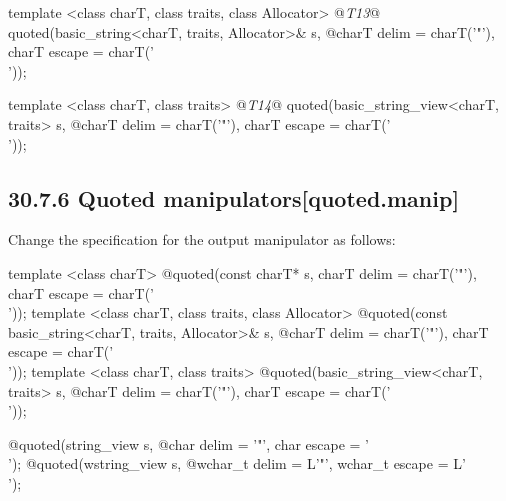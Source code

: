 \documentclass[ebook,11pt,article]{memoir}
\begin{document}
\begin{codeblock}
  template <class charT, class traits, class Allocator>
    @\textit{T13}@ quoted(basic_string<charT, traits, Allocator>& s,
    @\itcorr@           charT delim = charT('"'), charT escape = charT('\\'));

\end{codeblock}
\begin{removedblock}
\begin{codeblock}
  template <class charT, class traits>
    @\textit{T14}@ quoted(basic_string_view<charT, traits> s,
    @\itcorr@           charT delim = charT('"'), charT escape = charT('\\'));
\end{codeblock}
\end{removedblock}
\begin{codeblock}
}
\end{codeblock}
\subsection{30.7.6 Quoted manipulators[quoted.manip]}
Change the specification for the output manipulator as follows:
\begin{removedblock}
\begin{itemdecl}
template <class charT>
  @\unspec@ quoted(const charT* s, charT delim = charT('"'), charT escape = charT('\\'));
template <class charT, class traits, class Allocator>
  @\unspec@ quoted(const basic_string<charT, traits, Allocator>& s,
  @\itcorr@                   charT delim = charT('"'), charT escape = charT('\\'));
template <class charT, class traits>
  @\unspec@ quoted(basic_string_view<charT, traits> s,
  @\itcorr@                   charT delim = charT('"'), charT escape = charT('\\'));
\end{itemdecl}
\end{removedblock}
\begin{addedblock}
\begin{itemdecl}
  @\unspec@ quoted(string_view s,
  @\itcorr@                   char delim = '"', char escape = '\\');
  @\unspec@ quoted(wstring_view s,
  @\itcorr@                   wchar_t delim = L'"', wchar_t escape = L'\\');
\end{itemdecl}
\end{addedblock}
\end{document}
